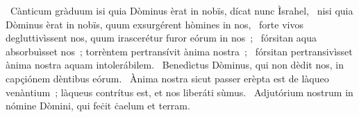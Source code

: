 {~Cànticum gràduum}
{%
isi quia Dòminus èrat in nobïs, dícat nunc Ìsrahel,
~nisi quia Dòminus èrat in nobïs, quum exsurgérent hòmines in nos,
~forte vivos degluttivìssent nos, quum irascerétur furor eórum in nos~;
~fórsitan aqua absorbuìsset nos~; torrèntem pertransívit ànima nostra~;
~fórsitan pertransivìsset ànima nostra aquam intolerábilem.
~Benedìctus Dòminus, qui non dèdit nos, in capçiónem dèntibus eórum.
~Ànima nostra sicut passer erèpta est de làqueo venàntium~; làqueus contrítus est, et nos liberáti sùmus.
~Adjutórium nostrum in nómine Dòmini, qui feċit ċaelum et terram.}
